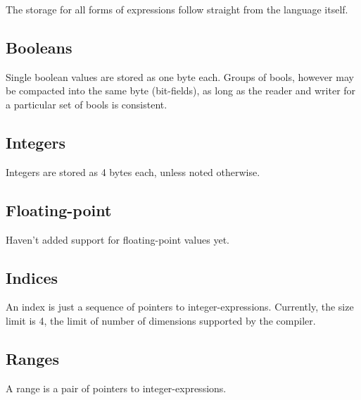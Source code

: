 The storage for all forms of expressions follow straight from the 
language itself.  

\subsection{Booleans}
\label{sec:common:expr:pbool}

Single boolean values are stored as one byte each.  
Groups of bools, however may be compacted into the same byte (bit-fields), 
as long as the reader and writer for a particular set of bools is consistent.  

\subsection{Integers}
\label{sec:common:expr:pint}

Integers are stored as 4 bytes each, unless noted otherwise.  

\subsection{Floating-point}
\label{app:common:expr:float}

Haven't added support for floating-point values yet.  

\subsection{Indices}
\label{app:common:expr:index}

An index is just a sequence of pointers to integer-expressions.  
Currently, the size limit is 4, the limit of number of dimensions
supported by the compiler.  

\subsection{Ranges}
\label{app:common:expr:range}

A range is a pair of pointers to integer-expressions.  

